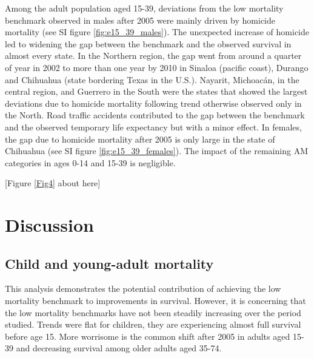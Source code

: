 \documentclass{bmcart}
\begin{document}
Among the adult population aged 15-39, deviations from the low mortality benchmark observed in males after 2005 were mainly driven by homicide mortality (see SI figure \ref{fig:e15_39_males}). The unexpected increase of homicide led to widening the gap between the benchmark and the observed survival in almost every state. In the Northern region, the gap went from around a quarter of year in 2002 to more than one year by 2010 in Sinaloa (pacific coast), Durango and Chihuahua (state bordering Texas in the U.S.). Nayarit, Michoac\'an, in the central region, and Guerrero in the South were the states that showed the largest deviations due to homicide mortality following trend otherwise observed only in the North. Road traffic accidents contributed to the gap between the benchmark and the observed temporary life expectancy but with a minor effect. In females, the gap due to homicide mortality after 2005 is only large in the state of Chihuahua (see SI figure \ref{fig:e15_39_females}). The impact of the remaining  AM categories in ages 0-14 and 15-39 is negligible. \\

\begin{center}
[Figure \ref{Fig4} about here]
\end{center}



\section*{Discussion}
\subsection*{Child and young-adult mortality}

This analysis demonstrates the potential contribution of achieving the low mortality benchmark to improvements in survival. However, it is concerning that the low mortality benchmarks have not been steadily increasing over the period studied. Trends were flat for children, they are experiencing almost full survival before age 15. More worrisome is the common shift after 2005 in adults aged 15-39 and decreasing survival among older adults aged 35-74.
\end{document}
